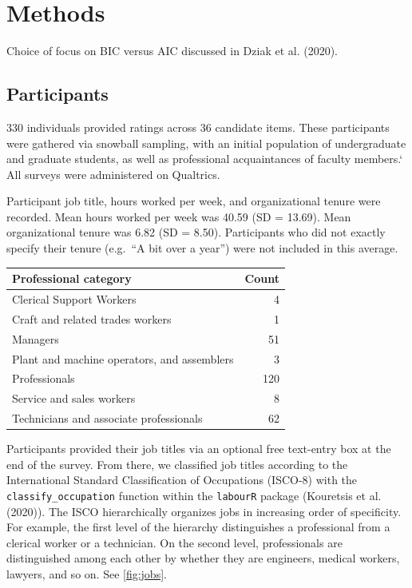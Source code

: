 \documentclass[
  english,
  man]{apa7}
\begin{document}
\hypertarget{methods}{%
\section{Methods}\label{methods}}

Choice of focus on BIC versus AIC discussed in Dziak et al. (2020).

\hypertarget{participants}{%
\subsection{Participants}\label{participants}}

330 individuals provided ratings across 36 candidate items. These participants were gathered via snowball sampling, with an initial population of undergraduate and graduate students, as well as professional acquaintances of faculty members.` All surveys were administered on Qualtrics.

Participant job title, hours worked per week, and organizational tenure were recorded. Mean hours worked per week was 40.59 (SD = 13.69). Mean organizational tenure was 6.82 (SD = 8.50). Participants who did not exactly specify their tenure (e.g.~``A bit over a year'') were not included in this average.

\begin{tabular}{l|r}
\hline
Professional category & Count\\
\hline
Clerical Support Workers & 4\\
\hline
Craft and related trades workers & 1\\
\hline
Managers & 51\\
\hline
Plant and machine operators, and assemblers & 3\\
\hline
Professionals & 120\\
\hline
Service and sales workers & 8\\
\hline
Technicians and associate professionals & 62\\
\hline
\end{tabular}

Participants provided their job titles via an optional free text-entry box at the end of the survey. From there, we classified job titles according to the International Standard Classification of Occupations (ISCO-8) with the \texttt{classify\_occupation} function within the \texttt{labourR} package (Kouretsis et al. (2020)). The ISCO hierarchically organizes jobs in increasing order of specificity. For example, the first level of the hierarchy distinguishes a professional from a clerical worker or a technician. On the second level, professionals are distinguished among each other by whether they are engineers, medical workers, lawyers, and so on. See \ref{fig:jobs}.
\end{document}
